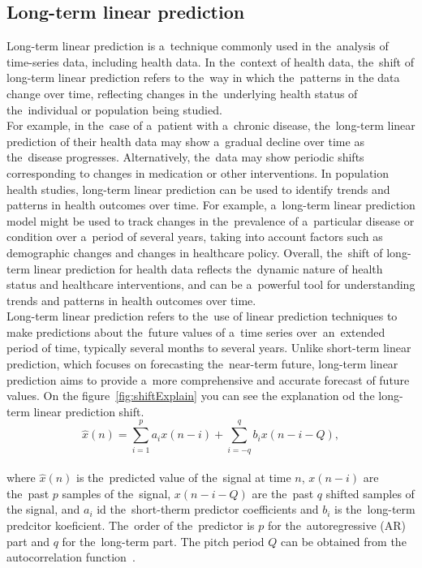 \subsection{Long-term linear prediction}\label{subsec:longlp}
Long-term linear prediction is a~technique commonly used in the~analysis of time-series data, including health data.
In the~context of health data, the~shift of long-term linear prediction refers to the~way in which the~patterns in the
data change over time, reflecting changes in the~underlying health status of the~individual or population being studied.\\
For example, in the~case of a~patient with a~chronic disease, the~long-term linear prediction of their health data may
show a~gradual decline over time as the~disease progresses. Alternatively, the~data may show periodic shifts
corresponding to changes in medication or other interventions. In population health studies, long-term linear
prediction can be used to identify trends and patterns in health outcomes over time. For example, a~long-term linear
prediction model might be used to track changes in the~prevalence of a~particular disease or condition
over a~period of several years, taking into account factors such as demographic changes and changes in healthcare policy.
Overall, the~shift of long-term linear prediction for health data reflects the~dynamic nature of health status and
healthcare interventions, and can be a~powerful tool for understanding trends and patterns in health outcomes over time.
\\
Long-term linear prediction refers to the~use of linear prediction techniques to make predictions about the~future
values of a~time series over~an~extended period of time, typically several months to several years. Unlike short-term
linear prediction, which focuses on forecasting the~near-term future, long-term linear prediction aims to provide a~more
comprehensive and accurate forecast of future values. On the figure~\ref{fig:shiftExplain} you can see the explanation od the long-term linear prediction shift.\\
\begin{equation}\label{eq:ltlp}
    \hat{x}(n) = \sum_{i=1}^{p} a_i x(n-i) + \sum_{i=-q}^{q} b_i x(n-i-Q),
\end{equation}
\\
where $\hat{x}(n)$ is the~predicted value of the~signal at time $n$, $x(n-i)$ are the~past $p$ samples of the~signal, $x(n-i-Q)$ are the~past $q$ shifted samples of the signal, and $a_i$ id the~short-therm predictor coefficients and $b_i$ is the~long-term predcitor koeficient. The~order of the~predictor is $p$ for the~autoregressive (AR) part and $q$ for the~long-term part. The pitch period $Q$ can be obtained from the autocorrelation function~\cite{vaseghi2008advanced}.\\
